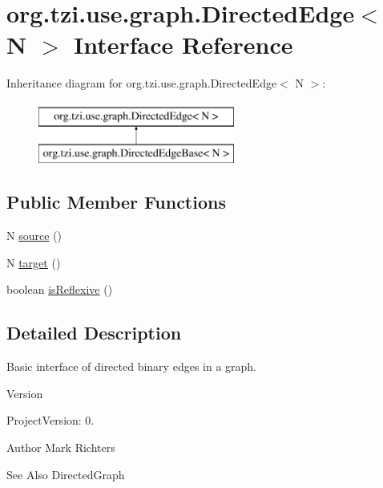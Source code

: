 \hypertarget{interfaceorg_1_1tzi_1_1use_1_1graph_1_1_directed_edge_3_01_n_01_4}{\section{org.\-tzi.\-use.\-graph.\-Directed\-Edge$<$ N $>$ Interface Reference}
\label{interfaceorg_1_1tzi_1_1use_1_1graph_1_1_directed_edge_3_01_n_01_4}
}
Inheritance diagram for org.\-tzi.\-use.\-graph.\-Directed\-Edge$<$ N $>$\-:\begin{figure}[H]
\begin{center}
\leavevmode
\includegraphics[height=2.000000cm]{interfaceorg_1_1tzi_1_1use_1_1graph_1_1_directed_edge_3_01_n_01_4}
\end{center}
\end{figure}
\subsection*{Public Member Functions}
\begin{DoxyCompactItemize}
\item 
N \hyperlink{interfaceorg_1_1tzi_1_1use_1_1graph_1_1_directed_edge_3_01_n_01_4_ad6eb0ad0b5028a32d71b1dc1939ea7fe}{source} ()
\item 
N \hyperlink{interfaceorg_1_1tzi_1_1use_1_1graph_1_1_directed_edge_3_01_n_01_4_a51d1fbbe17f0b1fc4abf31c85daaad13}{target} ()
\item 
boolean \hyperlink{interfaceorg_1_1tzi_1_1use_1_1graph_1_1_directed_edge_3_01_n_01_4_a492937076b12b51d12660218bb311523}{is\-Reflexive} ()
\end{DoxyCompactItemize}


\subsection{Detailed Description}
Basic interface of directed binary edges in a graph.

\begin{DoxyVersion}{Version}

\end{DoxyVersion}
\begin{DoxyParagraph}{Project\-Version\-:}
0. 
\end{DoxyParagraph}
\begin{DoxyAuthor}{Author}
Mark Richters 
\end{DoxyAuthor}
\begin{DoxySeeAlso}{See Also}
Directed\-Graph 
\end{DoxySeeAlso}

